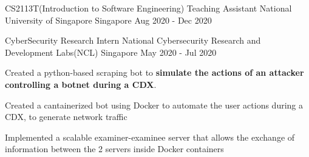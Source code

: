 

\begin{cventries}


  \cventry
  {CS2113T(Introduction to Software Engineering) Teaching Assistant} %
  {National University of Singapore} %
  {Singapore} %
  {Aug 2020 - Dec 2020} %
  {
    \begin{cvitems}
      \item {}
    \end{cvitems}
  }

  \cventry
  {CyberSecurity Research Intern} %
  {National Cybersecurity Research and Development Labs(NCL)} %
  {Singapore} %
  {May 2020 - Jul 2020} %
  {
    \begin{cvitems}
      \item {Created a python-based scraping bot to \textbf{simulate the actions of an attacker controlling a botnet during a CDX}.}
      \item {Created a cantainerized bot using Docker to automate the user actions during a CDX, to generate network traffic}
      \item {Implemented a scalable examiner-examinee server that allows the exchange of information between the 2 servers inside Docker containers}
    \end{cvitems}
  }


\end{cventries}
